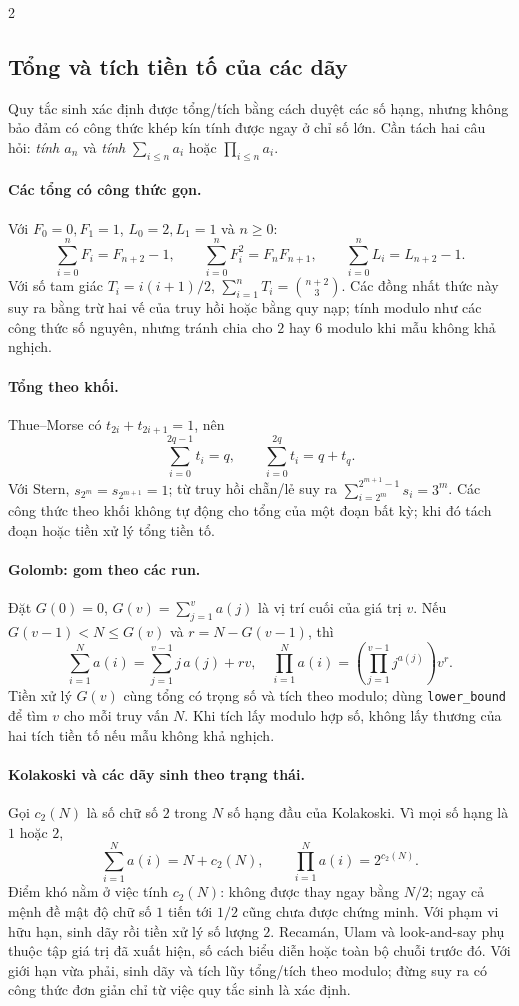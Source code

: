 \begin{multicols}{2}
\subsection{Tổng và tích tiền tố của các dãy}
Quy tắc sinh xác định được tổng/tích bằng cách duyệt các số hạng,
nhưng không bảo đảm có công thức khép kín tính được ngay ở chỉ số lớn.
Cần tách hai câu hỏi: \emph{tính $a_n$} và \emph{tính}
$\sum_{i\le n}a_i$ hoặc $\prod_{i\le n}a_i$.

\paragraph{Các tổng có công thức gọn.}
Với $F_0=0,F_1=1$, $L_0=2,L_1=1$ và $n\ge0$:
\[
\sum_{i=0}^{n}F_i=F_{n+2}-1,\qquad
\sum_{i=0}^{n}F_i^2=F_nF_{n+1},\qquad
\sum_{i=0}^{n}L_i=L_{n+2}-1.
\]
Với số tam giác $T_i=i(i+1)/2$,
$\sum_{i=1}^{n}T_i=\binom{n+2}{3}$.
Các đồng nhất thức này suy ra bằng trừ hai vế của truy hồi
hoặc bằng quy nạp; tính modulo như các công thức số nguyên,
nhưng tránh chia cho $2$ hay $6$ modulo khi mẫu không khả nghịch.

\paragraph{Tổng theo khối.}
Thue--Morse có $t_{2i}+t_{2i+1}=1$, nên
\[
\sum_{i=0}^{2q-1}t_i=q,\qquad
\sum_{i=0}^{2q}t_i=q+t_q.
\]
Với Stern, $s_{2^m}=s_{2^{m+1}}=1$;
từ truy hồi chẵn/lẻ suy ra
$\sum_{i=2^m}^{2^{m+1}-1}s_i=3^m$.
Các công thức theo khối không tự động cho tổng của một đoạn
bất kỳ; khi đó tách đoạn hoặc tiền xử lý tổng tiền tố.

\paragraph{Golomb: gom theo các run.}
Đặt $G(0)=0$, $G(v)=\sum_{j=1}^{v}a(j)$ là vị trí cuối
của giá trị $v$. Nếu $G(v-1)<N\le G(v)$ và
$r=N-G(v-1)$, thì
\[
\sum_{i=1}^{N}a(i)=\sum_{j=1}^{v-1}j\,a(j)+rv,
\quad
\prod_{i=1}^{N}a(i)=\left(\prod_{j=1}^{v-1}j^{a(j)}\right)v^r.
\]
Tiền xử lý $G(v)$ cùng tổng có trọng số và tích theo modulo;
dùng \texttt{lower\_bound} để tìm $v$ cho mỗi truy vấn $N$.
Khi tích lấy modulo hợp số, không lấy thương của hai tích
tiền tố nếu mẫu không khả nghịch.

\paragraph{Kolakoski và các dãy sinh theo trạng thái.}
Gọi $c_2(N)$ là số chữ số $2$ trong $N$ số hạng đầu của
Kolakoski. Vì mọi số hạng là $1$ hoặc $2$,
\[
\sum_{i=1}^{N}a(i)=N+c_2(N),\qquad
\prod_{i=1}^{N}a(i)=2^{c_2(N)}.
\]
Điểm khó nằm ở việc tính $c_2(N)$: không được thay ngay bằng
$N/2$; ngay cả mệnh đề mật độ chữ số $1$ tiến tới $1/2$
cũng chưa được chứng minh. Với phạm vi hữu hạn, sinh dãy rồi
tiền xử lý số lượng $2$.
Recamán, Ulam và look-and-say phụ thuộc tập giá trị đã xuất hiện,
số cách biểu diễn hoặc toàn bộ chuỗi trước đó. Với giới hạn vừa phải,
sinh dãy và tích lũy tổng/tích theo modulo; đừng suy ra có công thức
đơn giản chỉ từ việc quy tắc sinh là xác định.


\end{multicols}
